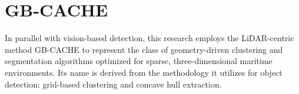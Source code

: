 \documentclass{erauthesis}
\begin{document}

\section{GB-CACHE} \label{gbcache}

In parallel with vision-based detection, this research employs the LiDAR-centric method GB-CACHE to represent the class of geometry-driven clustering and segmentation algorithms optimized for sparse, three-dimensional maritime environments.
Its name is derived from the methodology it utilizes for object detection: grid-based clustering and concave hull extraction.
\end{document}
